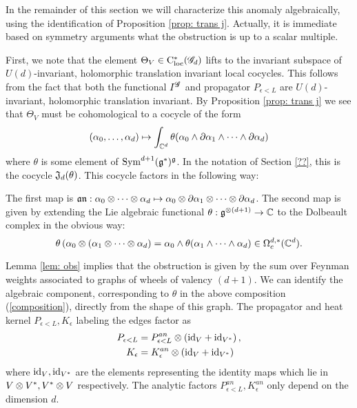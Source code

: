 In the remainder of this section we will characterize this anomaly algebraically, using the identification of Proposition \ref{prop: trans j}. 
Actually, it is immediate based on symmetry arguments what the obstruction is up to a scalar multiple. 

First, we note that the element $\Theta_V \in {\rm C}_{\rm loc}^*(\mathscr G_d)$ lifts to the invariant subspace of $U(d)$-invariant, holomorphic translation invariant local cocycles.
This follows from the fact that both the functional $I^{\mathscr G}$ and propagator $P_{\epsilon<L}$ are $U(d)$-invariant, holomorphic translation invariant.
By Proposition \ref{prop: trans j} we see that $\Theta_V$ must be cohomological to a cocycle of the form
\[
(\alpha_0, \ldots, \alpha_d) \mapsto \int_{\mathbb C^d} \theta(\alpha_0 \wedge \partial \alpha_1 \wedge \cdots \wedge \partial \alpha_d) 
\]
where $\theta$ is some element of ${\rm Sym}^{d+1}(\mathfrak g^*)^\mathfrak g$.
In the notation of Section \ref{??}, this is the cocycle $\mathfrak J_d (\theta)$. 
This cocycle factors in the following way:
\beqn
\label{composition}
\eeqn
The first map is $\mathfrak a \mathfrak n : \alpha_0 \otimes \cdots \otimes \alpha_d \mapsto \alpha_0 \otimes \partial \alpha_1 \otimes \cdots \otimes \partial \alpha_d$.
The second map is given by extending the Lie algebraic functional $\theta : \mathfrak g^{\otimes (d+1)} \to \mathbb C$ to the Dolbeault complex in the obvious way:
\[
\theta \left(\alpha_0 \otimes (\alpha_1 \otimes \cdots \otimes \alpha_d\right) = \alpha_0 \wedge \theta(\alpha_1 \wedge \cdots \wedge \alpha_d) \in \Omega^{d,*}_c(\mathbb C^d).
\]

Lemma \ref{lem: obs} implies that the obstruction is given by the sum over Feynman weights associated to graphs of wheels of valency $(d+1)$.
We can identify the algebraic component, corresponding to $\theta$ in the above composition (\ref{composition}), directly from the shape of this graph. 
The propagator and heat kernel $P_{\epsilon<L}, K_\epsilon$ labeling the edges factor as
\begin{align*}
P_{\epsilon<L} &= P^{an}_{\epsilon<L} \otimes \left({\rm id}_{V} + {\rm id}_{V^*}\right),\\ 
K_{\epsilon} &= K_{\epsilon}^{an} \otimes \left({\rm id}_{V} + {\rm id}_{V^*}\right)
\end{align*}
where ${\rm id}_V, {\rm id}_{V^*}$ are the elements representing the identity maps which lie in $V \otimes V^*, V^* \otimes V$ respectively. 
The analytic factors $P^{an}_{\epsilon<L},  K_{\epsilon}^{an}$ only depend on the dimension $d$. 

